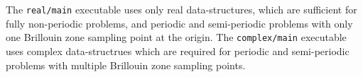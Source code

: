 The \verb|real/main| executable uses only real data-structures, which are sufficient for fully non-periodic problems, and periodic and semi-periodic problems with only one Brillouin zone sampling point at the origin. The \verb|complex/main| executable uses complex data-structrues which are required for periodic and semi-periodic problems with multiple Brillouin zone sampling points.
